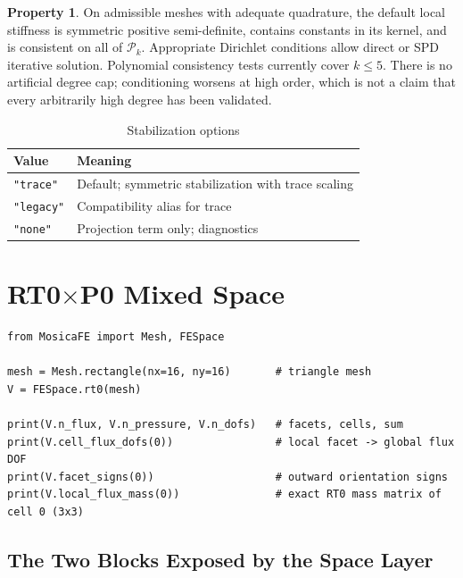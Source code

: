 \documentclass[11pt,oneside]{book}
\theoremstyle{definition}
\newtheorem{property}{Property}[chapter]
\theoremstyle{plain}
\newcommand{\code}[1]{\texttt{#1}}
\begin{document}
\begin{property}
On admissible meshes with adequate quadrature, the default local stiffness is
symmetric positive semi-definite, contains constants in its kernel, and is
consistent on all of $\mathcal P_k$. Appropriate Dirichlet conditions allow direct
or SPD iterative solution. Polynomial consistency tests currently cover $k\le5$.
There is no artificial degree cap; conditioning worsens at high order, which is
not a claim that every arbitrarily high degree has been validated.
\end{property}

\begin{table}[htbp]
\centering
\caption{Stabilization options}
\label{tab:stab}
\begin{lrbox}{\guideTableBox}
\begin{tabular}{@{}lp{9cm}@{}}
\toprule
Value & Meaning \\
\midrule
\code{"trace"} & Default; symmetric stabilization with trace scaling \\
\code{"legacy"} & Compatibility alias for trace \\
\code{"none"} & Projection term only; diagnostics \\
\bottomrule
\end{tabular}
\end{lrbox}%
\ifdim\wd\guideTableBox>\linewidth
  \resizebox{\linewidth}{!}{\usebox{\guideTableBox}}%
\else\usebox{\guideTableBox}\fi
\end{table}

\section{RT0\texorpdfstring{$\times$}{x}P0 Mixed Space}

\begin{lstlisting}[language=MosicaFE,caption={Mixed space}]
from MosicaFE import Mesh, FESpace

mesh = Mesh.rectangle(nx=16, ny=16)       # triangle mesh
V = FESpace.rt0(mesh)

print(V.n_flux, V.n_pressure, V.n_dofs)   # facets, cells, sum
print(V.cell_flux_dofs(0))                # local facet -> global flux DOF
print(V.facet_signs(0))                   # outward orientation signs
print(V.local_flux_mass(0))               # exact RT0 mass matrix of cell 0 (3x3)
\end{lstlisting}

\subsection{The Two Blocks Exposed by the Space Layer}
\end{document}
